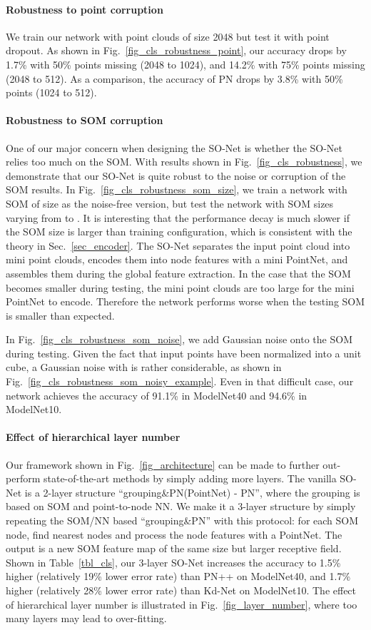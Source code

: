 \documentclass[10pt,twocolumn,letterpaper]{article}
\begin{document}
\paragraph{Robustness to point corruption}
We train our network with point clouds of size 2048 but test it with point dropout. As shown in Fig.~\ref{fig_cls_robustness_point}, our accuracy drops by 1.7\% with 50\% points missing (2048 to 1024), and 14.2\% with 75\% points missing (2048 to 512). As a comparison, the accuracy of PN drops by 3.8\% with 50\% points (1024 to 512).


\paragraph{Robustness to SOM corruption}
One of our major concern when designing the SO-Net is whether the SO-Net relies too much on the SOM. With results shown in Fig.~\ref{fig_cls_robustness}, we demonstrate that our SO-Net is quite robust to the noise or corruption of the SOM results. In Fig.~\ref{fig_cls_robustness_som_size}, we train a network with SOM of size  as the noise-free version, but test the network with SOM sizes varying from  to . It is interesting that the performance decay is much slower if the SOM size is larger than training configuration, which is consistent with the theory in Sec.~\ref{sec_encoder}. The SO-Net separates the input point cloud into  mini point clouds, encodes them into  node features with a mini PointNet, and assembles them during the global feature extraction. In the case that the SOM becomes smaller during testing, the mini point clouds are too large for the mini PointNet to encode. Therefore the network performs worse when the testing SOM is smaller than expected.

In Fig.~\ref{fig_cls_robustness_som_noise}, we add Gaussian noise  onto the SOM during testing. Given the fact that input points have been normalized into a unit cube, a Gaussian noise with  is rather considerable, as shown in Fig.~\ref{fig_cls_robustness_som_noisy_example}. Even in that difficult case, our network achieves the accuracy of 91.1\% in ModelNet40 and 94.6\% in ModelNet10. 


\paragraph{Effect of hierarchical layer number}
Our framework shown in Fig.~\ref{fig_architecture} can be made to further out-perform state-of-the-art methods by simply adding more layers. The vanilla SO-Net is a 2-layer structure ``grouping\&PN(PointNet) - PN'', where the grouping is based on SOM and point-to-node NN. We make it a 3-layer structure by simply repeating the SOM/NN based ``grouping\&PN'' with this protocol: for each SOM node, find  nearest nodes and process the  node features with a PointNet. The output is a new SOM feature map of the same size but larger receptive field. Shown in Table~\ref{tbl_cls}, our 3-layer SO-Net increases the accuracy to 1.5\% higher (relatively 19\% lower error rate) than PN++ on ModelNet40, and 1.7\% higher (relatively 28\% lower error rate) than Kd-Net on ModelNet10. The effect of hierarchical layer number is illustrated in Fig.~\ref{fig_layer_number}, where too many layers may lead to over-fitting.
\end{document}
